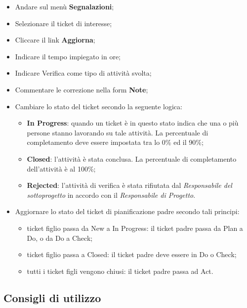 \begin{itemize}
\item Andare sul menù \textbf{Segnalazioni}; 
\item Selezionare il ticket di interesse; 
\item Cliccare il link \textbf{Aggiorna}; 
\item Indicare il tempo impiegato in ore; 
\item Indicare Verifica come tipo di attività svolta; 
\item Commentare le correzione nella form \textbf{Note}; 
\item Cambiare lo stato del ticket secondo la seguente logica:
		\begin{itemize}
		\item \textbf{In Progress}: quando un ticket è in questo stato indica che una o più persone 
		stanno lavorando su tale attività. La percentuale di completamento deve 
		essere impostata tra lo 0\% ed il 90\%; 
		\item \textbf{Closed}: l’attività è stata conclusa. La percentuale di completamento dell’attività è al 100\%; 
		\item \textbf{Rejected}: l’attività di verifica è stata rifiutata dal \emph{Responsabile del sottoprogetto} in accordo con il \emph{Responsabile di Progetto}. 
		
		\end{itemize}

\item Aggiornare lo stato del ticket di pianificazione padre secondo tali principi:
		\begin{itemize}
		\item ticket figlio passa da New a In Progress: il ticket padre passa da Plan a Do, 
		o da Do a Check; 
		\item ticket figlio passa a Closed: il ticket padre deve essere in Do o Check; 
		\item tutti i ticket figli vengono chiusi: il ticket padre passa ad Act. 
		
		\end{itemize} 

\end{itemize} 




\subsection{Consigli di utilizzo}
